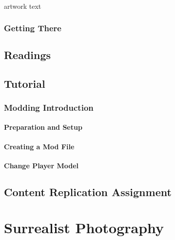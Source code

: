 \documentclass[
  openany]{book}
\begin{document}
artwork text

\hypertarget{getting-there-5}{%
\subsection{Getting There}\label{getting-there-5}}

\hypertarget{readings-3}{%
\section{Readings}\label{readings-3}}

\hypertarget{tutorial-3}{%
\section{Tutorial}\label{tutorial-3}}

\hypertarget{modding-introduction}{%
\subsection{Modding Introduction}\label{modding-introduction}}

\hypertarget{preparation-and-setup}{%
\subsubsection{Preparation and Setup}\label{preparation-and-setup}}

\hypertarget{creating-a-mod-file}{%
\subsubsection{Creating a Mod File}\label{creating-a-mod-file}}

\hypertarget{change-player-model}{%
\subsubsection{Change Player Model}\label{change-player-model}}

\hypertarget{content-replication-assignment-3}{%
\section{Content Replication Assignment}\label{content-replication-assignment-3}}

\hypertarget{surrealist-photography}{%
\chapter{Surrealist Photography}\label{surrealist-photography}}
\end{document}
